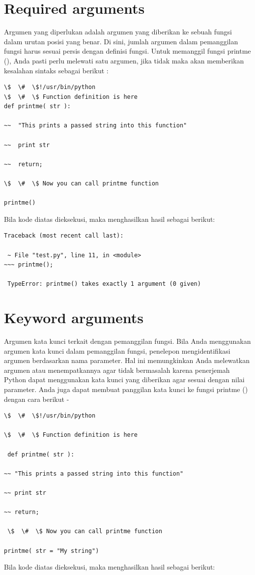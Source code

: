 \section{Required arguments} 
Argumen yang diperlukan adalah argumen yang diberikan ke sebuah fungsi dalam urutan posisi yang benar. Di sini, jumlah argumen dalam pemanggilan fungsi harus sesuai persis dengan definisi fungsi. Untuk memanggil fungsi printme (), Anda pasti perlu melewati satu argumen, jika tidak maka akan memberikan kesalahan sintaks sebagai berikut :
\begin{verbatim}
\$  \#  \$!/usr/bin/python 
\$  \#  \$ Function definition is here 
def printme( str ): 

~~  "This prints a passed string into this function" 

~~  print str

~~  return;

\$  \#  \$ Now you can call printme function 

printme() 
\end{verbatim}
Bila kode diatas dieksekusi, maka menghasilkan hasil sebagai berikut: 
\begin{verbatim}
Traceback (most recent call last): 

 ~ File "test.py", line 11, in <module> 
~~~ printme();

 TypeError: printme() takes exactly 1 argument (0 given) 
\end{verbatim}
\section{Keyword arguments} 
Argumen kata kunci terkait dengan pemanggilan fungsi. Bila Anda menggunakan argumen kata kunci dalam pemanggilan fungsi, penelepon mengidentifikasi argumen berdasarkan nama parameter. Hal ini memungkinkan Anda melewatkan argumen atau menempatkannya agar tidak bermasalah karena penerjemah Python dapat menggunakan kata kunci yang diberikan agar sesuai dengan nilai parameter. Anda juga dapat membuat panggilan kata kunci ke fungsi printme () dengan cara berikut - 
\begin{verbatim}
\$  \#  \$!/usr/bin/python

\$  \#  \$ Function definition is here

 def printme( str ): 

~~ "This prints a passed string into this function" 

~~ print str 

~~ return; 

 \$  \#  \$ Now you can call printme function 

printme( str = "My string") 
\end{verbatim}
Bila kode diatas dieksekusi, maka menghasilkan hasil sebagai berikut:

